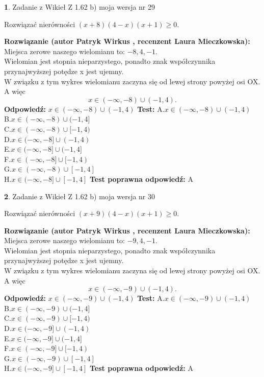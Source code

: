 \documentclass[12pt, a4paper]{article}
\theoremstyle{definition} %
\newtheorem{zad}{}
\newcommand{\zadStart}[1]{\begin{zad}#1\newline}
\newcommand{\zadStop}{\end{zad}}
\newcommand{\rozwStart}[2]{\noindent \textbf{Rozwiązanie (autor #1 , recenzent #2): }\newline}
\newcommand{\rozwStop}{\newline}
\newcommand{\odpStart}{\noindent \textbf{Odpowiedź:}\newline}
\newcommand{\odpStop}{\newline}
\newcommand{\testStart}{\noindent \textbf{Test:}\newline}
\newcommand{\testStop}{\newline}
\newcommand{\kluczStart}{\noindent \textbf{Test poprawna odpowiedź:}\newline}
\newcommand{\kluczStop}{\newline}
\begin{document}
\zadStart{Zadanie z Wikieł Z 1.62 b) moja wersja nr 29}

Rozwiązać nierówności $(x+8)(4-x)(x+1)\ge0$.
\zadStop
\rozwStart{Patryk Wirkus}{Laura Mieczkowska}
Miejsca zerowe naszego wielomianu to: $-8, 4, -1$.\\
Wielomian jest stopnia nieparzystego, ponadto znak współczynnika przy\linebreak najwyższej potędze x jest ujemny.\\ W związku z tym wykres wielomianu zaczyna się od lewej strony powyżej osi OX. A więc $$x \in (-\infty,-8) \cup (-1,4).$$
\rozwStop
\odpStart
$x \in (-\infty,-8) \cup (-1,4)$
\odpStop
\testStart
A.$x \in (-\infty,-8) \cup (-1,4)$\\
B.$x \in (-\infty,-8) \cup (-1,4]$\\
C.$x \in (-\infty,-8) \cup [-1,4)$\\
D.$x \in (-\infty,-8] \cup (-1,4)$\\
E.$x \in (-\infty,-8] \cup (-1,4]$\\
F.$x \in (-\infty,-8] \cup [-1,4)$\\
G.$x \in (-\infty,-8) \cup [-1,4]$\\
H.$x \in (-\infty,-8] \cup [-1,4]$
\testStop
\kluczStart
A
\kluczStop



\zadStart{Zadanie z Wikieł Z 1.62 b) moja wersja nr 30}

Rozwiązać nierówności $(x+9)(4-x)(x+1)\ge0$.
\zadStop
\rozwStart{Patryk Wirkus}{Laura Mieczkowska}
Miejsca zerowe naszego wielomianu to: $-9, 4, -1$.\\
Wielomian jest stopnia nieparzystego, ponadto znak współczynnika przy\linebreak najwyższej potędze x jest ujemny.\\ W związku z tym wykres wielomianu zaczyna się od lewej strony powyżej osi OX. A więc $$x \in (-\infty,-9) \cup (-1,4).$$
\rozwStop
\odpStart
$x \in (-\infty,-9) \cup (-1,4)$
\odpStop
\testStart
A.$x \in (-\infty,-9) \cup (-1,4)$\\
B.$x \in (-\infty,-9) \cup (-1,4]$\\
C.$x \in (-\infty,-9) \cup [-1,4)$\\
D.$x \in (-\infty,-9] \cup (-1,4)$\\
E.$x \in (-\infty,-9] \cup (-1,4]$\\
F.$x \in (-\infty,-9] \cup [-1,4)$\\
G.$x \in (-\infty,-9) \cup [-1,4]$\\
H.$x \in (-\infty,-9] \cup [-1,4]$
\testStop
\kluczStart
A
\kluczStop
\end{document}
